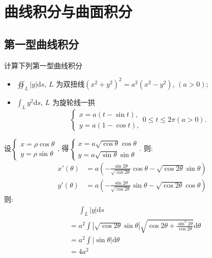 \chapter{曲线积分与曲面积分}
\section{第一型曲线积分}
\begin{problem}
    计算下列第一型曲线积分
    \begin{itemize}
        \item \(\displaystyle\oiint_{L}|y|\mathrm{d}s\), \(L\)
            为双扭线\((x^2 + y^2)^2 = a^2
            (x^2 - y^2)\), \((a > 0)\);
        \item \(\int_{L} y^2 \mathrm{d}s\), \(L\) 为旋轮线一拱
            \[
                \begin{cases}
                    x = a(t - \sin t), \\
                    y = a(1 - \cos t),
                \end{cases}  0 \leq t \leq 2\pi (a > 0).
            \]
    \end{itemize}

\end{problem}

\begin{solution}
    设\(
        \begin{cases}
            x = \rho \cos \theta \\
            y = \rho \sin \theta
    \end{cases}\), 得\(
        \begin{cases}
            x = a \sqrt{\cos \theta}\cos \theta \\
            y = a \sqrt{\sin \theta}\sin \theta
    \end{cases}\). 则:
    \begin{align*}
        x'(\theta) &= a \left( - \frac{\sin 2\theta}{\sqrt{\cos
        2\theta}} \cos\theta - \sqrt{\cos2\theta} \sin\theta \right)\\
        y'(\theta) &= a \left( - \frac{\sin 2\theta}{\sqrt{\cos
        2\theta}} \sin\theta - \sqrt{\cos2\theta} \cos\theta \right)
    \end{align*}
    则:
    \begin{align*}
        &\mathrel{\phantom{=}} \int_{L} \left| y \right|
        \mathrm{d}s \\
        &= a^{2} \int \left| \sqrt{\cos2\theta}\sin\theta
        \right|\sqrt{\cos2\theta +
        \frac{\sin^{2}2\theta}{\cos2\theta}} \mathrm{d}\theta \\
        &= a^{2}\int \left| \sin\theta \right|  \mathrm{d}\theta \\
        &= 4a^{2}
    \end{align*}
\end{solution}

